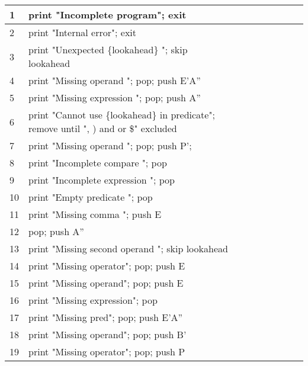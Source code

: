 \documentclass[11pt, a4paper]{article}
\begin{document}
\begin{table}[!ht]
\end{table}

\begin{table}[!ht]
    \centering
    \begin{tabular}{|l|l|l|l|l|l|l|l|l|}
    \hline
        1 & print "Incomplete program"; exit  \\ \hline
        2 & print "Internal error"; exit \\ \hline
        3 & print "Unexpected \{lookahead\} "; skip lookahead \\ \hline
        4 & print "Missing operand "; pop; push E'A'' \\ \hline
        5 & print "Missing expression "; pop; push A'' \\ \hline
        6 & print "Cannot use \{lookahead\} in predicate"; remove until ", ) and or \$" excluded \\ \hline
        7 & print "Missing operand "; pop; push P'; \\ \hline
        8 & print "Incomplete compare "; pop \\ \hline
        9 & print "Incomplete expression "; pop \\ \hline
        10 & print "Empty predicate "; pop \\ \hline
        11 & print "Missing comma "; push E \\ \hline
        12 & pop; push A'' \\ \hline
        13 & print "Missing second operand "; skip lookahead \\ \hline
        14 & print "Missing operator"; pop; push E \\ \hline
        15 & print "Missing operand"; pop; push E \\ \hline
        16 & print "Missing expression"; pop \\ \hline
        17 & print "Missing pred"; pop; push E'A'' \\ \hline
        18 & print "Missing operand"; pop; push B' \\ \hline
        19 & print "Missing operator"; pop; push P \\ \hline
    \end{tabular}
\end{table}
\end{document}
